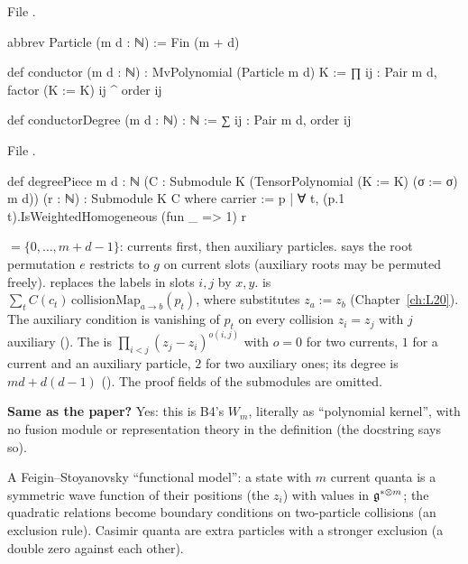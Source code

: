 \noindent File .
\begin{leancode}
abbrev Particle (m d : ℕ) := Fin (m + d)

def conductor (m d : ℕ) : MvPolynomial (Particle m d) K :=
  ∏ ij : Pair m d, factor (K := K) ij ^ order ij

def conductorDegree (m d : ℕ) : ℕ := ∑ ij : Pair m d, order ij
\end{leancode}
\noindent File .
\begin{leancode}
def degreePiece {m d : ℕ}
    (C : Submodule K (TensorPolynomial (K := K) (σ := σ) m d)) (r : ℕ) :
    Submodule K C where
  carrier := {p | ∀ t, (p.1 t).IsWeightedHomogeneous (fun _ => 1) r}
\end{leancode}

\begin{dictionary}
 $=\{0,\dots,m+d-1\}$: currents first, then auxiliary particles. 
says the root permutation $e$ restricts to $g$ on current slots (auxiliary roots may be permuted freely).
 replaces the labels in slots $i,j$ by $x,y$. 
is $\sum_tC(c_t)\,\mathrm{collisionMap}_{a\to b}(p_t)$, where  substitutes $z_a:=z_b$
(Chapter~\ref{ch:L20}). The auxiliary condition is vanishing of $p_t$ on every collision $z_i=z_j$ with $j$
auxiliary (). The  is $\prod_{i<j}(z_j-z_i)^{o(i,j)}$ with $o=0$ for two
currents, $1$ for a current and an auxiliary particle, $2$ for two auxiliary ones; its degree is
$md+d(d-1)$ (). The proof fields of the submodules are omitted.

\textbf{Same as the paper?} Yes: this is B4's $W_m$, literally as ``polynomial kernel'', with no fusion
module or representation theory in the definition (the docstring says so).
\end{dictionary}

\begin{physics}
A Feigin--Stoyanovsky ``functional model'': a state with $m$ current quanta is a symmetric wave function of
their positions (the $z_i$) with values in $\mathfrak g^{*\otimes m}$; the quadratic relations become
boundary conditions on two-particle collisions (an exclusion rule). Casimir quanta are extra particles with
a stronger exclusion (a double zero against each other).
\end{physics}

